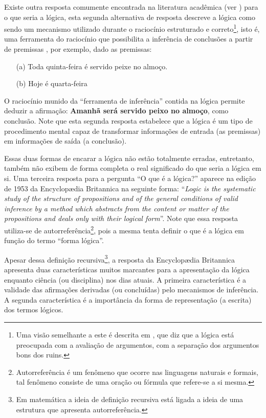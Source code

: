 Existe outra resposta comumente encontrada na literatura acadêmica (ver \cite{abe2002-logica, BenjaV1, joaoPavao2014}) para o que seria a lógica, esta segunda alternativa de resposta  descreve a lógica como sendo um mecanismo utilizado durante o raciocínio estruturado e correto\footnote{Uma visão semelhante a este é descrita em \cite{magnus2020}, que diz que a lógica está preocupada com a avaliação de argumentos, com a separação dos argumentos bons dos ruins.}, isto é, uma ferramenta do raciocínio que possibilita a inferência de conclusões a partir de premissas \cite{abe2002-logica, copi1981, hodges1997}, por exemplo, dado as premissas:

\begin{itemize}
	\item[(a)] Toda quinta-feira é servido peixe no almoço.
	\item[(b)] Hoje é quarta-feira
\end{itemize}

O raciocínio munido da ``ferramenta de inferência'' contida na lógica permite deduzir a afirmação: \textbf{Amanhã será servido peixo no almoço}, como conclusão. Note que esta segunda resposta estabelece que a lógica é um tipo de procedimento mental capaz de transformar informações de entrada (as premissas) em informações de saída (a conclusão). 

Essas duas formas de encarar a lógica não estão totalmente erradas, entretanto, também não exibem de forma completa o real significado do que seria a lógica em si. Uma terceira resposta para a pergunta ``O que é a lógica?'' aparece na edição de 1953 da Encyclopædia Britannica na seguinte forma: ``\textit{Logic is the systematic study of the structure of propositions and of the general conditions of valid inference by a method which abstracts from the content or matter of the propositions and deals only with their logical form}''. Note que essa resposta utiliza-se de autorreferência\footnote{Autorreferência é um fenômeno que ocorre nas linguagens naturais e formais, tal fenômeno consiste de uma oração ou fórmula que refere-se a si mesma.}, pois a mesma tenta definir o que é a lógica em função do termo ``forma lógica''. 

Apesar dessa definição recursiva\footnote{Em matemática a ideia de definição recursiva está ligada a ideia de uma estrutura que apresenta autorreferência.}, a resposta da Encyclopædia Britannica apresenta duas características muitos marcantes para a apresentação da lógica enquanto ciência (ou disciplina) nos dias atuais. A primeira característica é a validade das afirmações derivadas (ou concluídas) pelo mecanismos de inferência. A segunda característica é a importância da forma de representação (a escrita) dos termos lógicos. 

